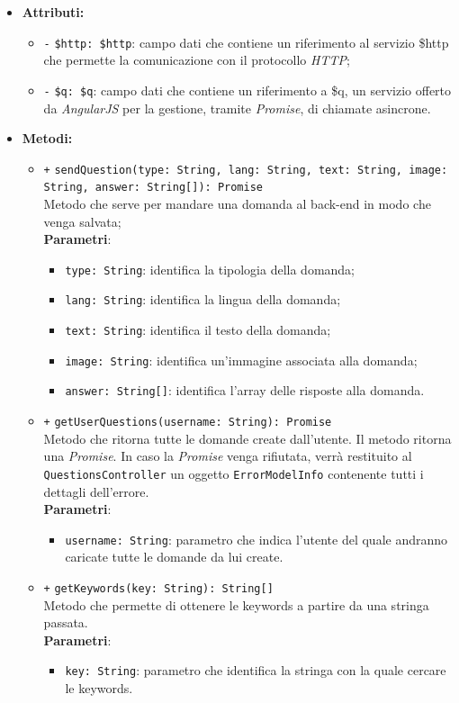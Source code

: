 \begin{itemize}
\begin{itemize}
	\end{itemize}
	\item \textbf{Attributi:}
	\begin{itemize}
		\item \texttt{-} \texttt{\$http: \$http}: campo dati che contiene un riferimento al servizio \$http che permette la comunicazione con il protocollo \textit{HTTP};
		\item \texttt{-} \texttt{\$q: \$q}: campo dati che contiene un riferimento a \$q, un servizio offerto da \textit{AngularJS} per la gestione, tramite \textit{Promise}, di chiamate asincrone.
	\end{itemize}
	\item \textbf{Metodi:}
	\begin{itemize}
		\item \texttt{+} \texttt{sendQuestion(type: String, lang: String, text: String, image: String, answer: String[]): Promise} \\Metodo che serve per mandare una domanda al back-end in modo che venga salvata;\\
		\textbf{Parametri}: 
		\begin{itemize}
			\item \texttt{type: String}: identifica la tipologia della domanda;
			\item \texttt{lang: String}: identifica la lingua della domanda;
			\item \texttt{text: String}: identifica il testo della domanda;
			\item \texttt{image: String}: identifica un'immagine associata alla domanda;
			\item \texttt{answer: String[]}: identifica l'array delle risposte alla domanda.
		\end{itemize}
		\item \texttt{+} \texttt{getUserQuestions(username: String): Promise} \\Metodo che ritorna tutte le domande create dall'utente. Il metodo ritorna una \textit{Promise}. In caso la \textit{Promise} venga rifiutata, verrà restituito al \texttt{QuestionsController} un oggetto \texttt{ErrorModelInfo} contenente tutti i dettagli dell'errore. \\
		\textbf{Parametri}:
		\begin{itemize}
			\item \texttt{username: String}: parametro che indica l'utente del quale andranno caricate tutte le domande da lui create.
		\end{itemize}
		\item \texttt{+} \texttt{getKeywords(key: String): String[]}\\ Metodo che permette di ottenere le keywords a partire da una stringa passata.\\
		\textbf{Parametri}:
		\begin{itemize}
			\item \texttt{key: String}: parametro che identifica la stringa con la quale cercare le keywords.
		\end{itemize} 
	\end{itemize}
\end{itemize}

